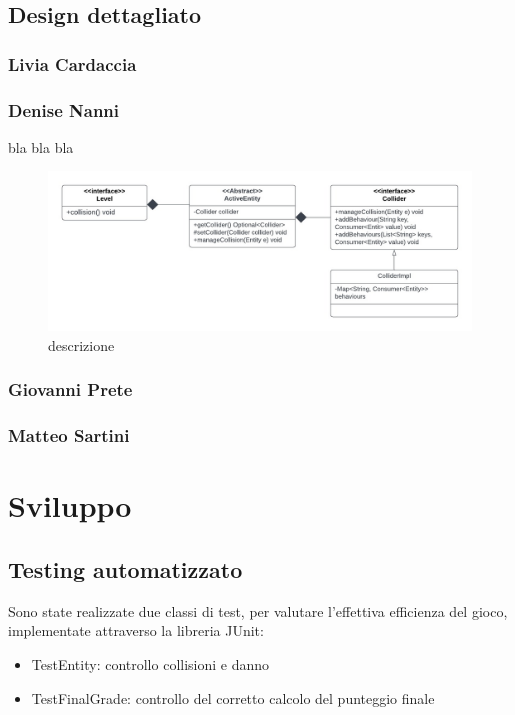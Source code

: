 \documentclass{article}
\begin{document}
\subsection{Design dettagliato}
\subsubsection{Livia Cardaccia}

\subsubsection{Denise Nanni}
bla bla bla
\begin{figure}[ht]
    \includegraphics[width=1\textwidth]{umlCollider.jpg}
    \caption{descrizione}
    \label{fig:schgen}
\end{figure}
\subsubsection{Giovanni Prete}
\subsubsection{Matteo Sartini}
\section{Sviluppo}
\subsection{Testing automatizzato}
Sono state realizzate due classi di test, per valutare l'effettiva efficienza del gioco, implementate attraverso la libreria JUnit:
\begin{itemize}
    \item TestEntity: controllo collisioni e danno
    \item TestFinalGrade: controllo del corretto calcolo del punteggio finale
\end{itemize}
\end{document}
